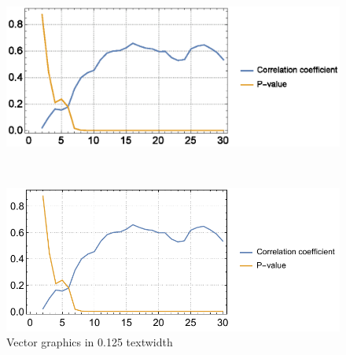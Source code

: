 \documentclass{egpubl}
\begin{document}
\begin{figure}
	\centering
	\begin{minipage}{.125\textwidth}
		\includegraphics[width=1\linewidth]{images/C_spearman.eps}
	\end{minipage}~
	\begin{minipage}{.125\textwidth}
		\includegraphics[width=1\linewidth]{images/C_spearman.pdf}
	\end{minipage}
	\caption{Vector graphics in 0.125 textwidth}
	\label{fig:vector_graphics3}
\end{figure}
	
\end{document}
